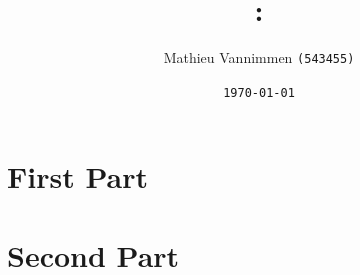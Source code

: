 \documentclass{article}
\title{\texttt{\theMnemonic}: \theCourse \\ \texttt{\theThematic}}
\author{Mathieu Vannimmen \texttt{(543455)}}
\date{\texttt{\today}}
\begin{document}
\maketitle

{\hypersetup{linkcolor=black}
    \tableofcontents
}
\newpage

\section{First Part}\label{sec:firstpart}

    

    

    

    

\newpage
\section{Second Part}\label{sec:secondpart}

    

    

    

    


\newpage
    
    
\end{document}
